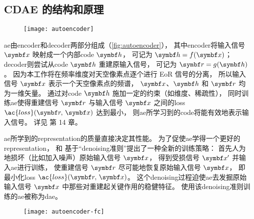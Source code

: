 \subsection{CDAE 的结构和原理}
\label{sec:cdae}

\begin{figure}[htp]
  \centering
  \texttt{[image: autoencoder]}
  \label{fig:autoencoder}
\end{figure}

\ac{ae}由\ac{encoder}和\ac{decoder}两部分组成（\autoref{fig:autoencoder}），
其中\ac{encoder}将输入信号 $\B{x}$ 映射成一个内部\ac{code} $\B{h}$，
可记为 $\B{h} = f(\B{x})$；
\ac{decoder}则尝试从\ac{code} $\B{h}$ 重建原输入信号，
可记为 $\B{r} = g(\B{h})$。
因为本工作将在频率维度对天空像素点逐个进行 EoR 信号的分离，
所以输入信号 $\B{x}$ 表示一个天空像素点的频谱，
$\B{x}$、$\B{h}$ 和 $\B{r}$ 均为一维矢量。
通过对\ac{code} $\B{h}$ 施加一定的约束（如维度、稀疏性），
同时训练\ac{ae}使得重建信号 $\B{r}$ 与输入信号 $\B{x}$
之间的\acl{loss} $\ac{loss}(\B{r}, \,\B{x})$ 达到最小，
则\ac{ae}所学习到的\ac{code}将能有效地表示输入信号。
详见  第 14 章。

\ac{ae}所学到的\ac{representation}的质量直接决定其性能。
为了促使\ac{ae}学得一个更好的\ac{representation}，
 和 
基于\enquote{\ac{denoising}准则}提出了一种全新的训练策略：
首先人为地损坏（比如加入噪声）原始输入信号 $\B{x}$，
得到受损信号 $\B{x}'$ 并输入\ac{ae}进行训练，
使重建信号 $\B{r}$ 尽可能地恢复原始输入信号 $\B{x}$，
即最小化\acl{loss} $\ac{loss}(\B{r}, \,\B{x})$。
这个\ac{denoising}过程迫使\ac{ae}去发掘原始输入信号 $\B{x}$
中那些对重建起关键作用的稳健特征。
使用该\ac{denoising}准则训练的\ac{ae}被称为\ac{dae}。

\begin{figure}[htp]
  \centering
  \texttt{[image: autoencoder-fc]}
  \label{fig:autoencoder-fc}
\end{figure}

